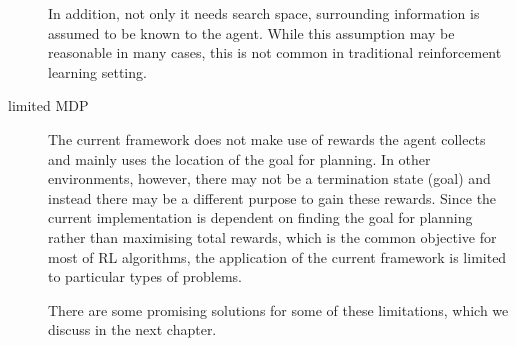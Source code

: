 \begin{description}
In addition, not only it needs search space, surrounding information is assumed to be known to the agent. 
While this assumption may be reasonable in many cases, this is not common in traditional reinforcement learning setting.

\item[limited MDP]
The current framework does not make use of rewards the agent collects and mainly uses the location of the goal for planning.
In other environments, however, there may not be a termination state (goal) and instead there may be a different purpose to gain these rewards. 
Since the current implementation is dependent on finding the goal for planning rather than maximising total rewards, 
which is the common objective for most of RL algorithms,
the application of the current framework is limited to particular types of problems.

There are some promising solutions for some of these limitations, which we discuss in the next chapter.

\end{description}  

